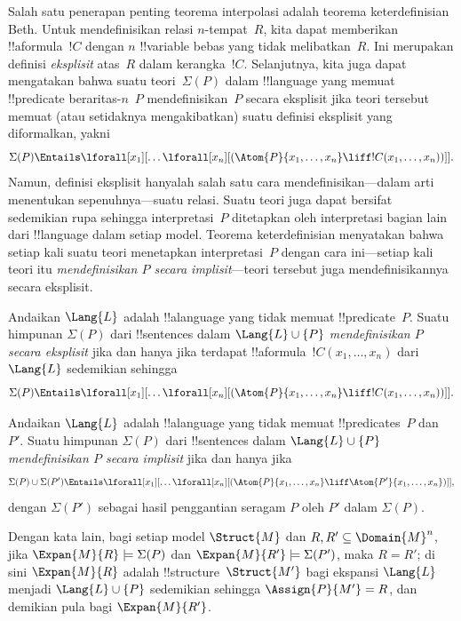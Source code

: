 \documentclass[../../../include/open-logic-section]{subfiles}
\begin{document}


Salah satu penerapan penting teorema interpolasi adalah teorema
keterdefinisian Beth. Untuk mendefinisikan relasi $n$-tempat~$R$, kita dapat
memberikan !!a{formula}~$!C$ dengan $n$ !!{variable} bebas yang tidak
melibatkan~$R$. Ini merupakan definisi \emph{eksplisit} atas~$R$ dalam
kerangka~$!C$. Selanjutnya, kita juga dapat mengatakan bahwa suatu
teori~$\Sigma(P)$ dalam !!{language} yang memuat !!{predicate}
beraritas-$n$~$P$ mendefinisikan~$P$ secara eksplisit jika teori tersebut
memuat (atau setidaknya mengakibatkan) suatu definisi eksplisit yang
diformalkan, yakni
\[
\Sigma(P) \Entails \lforall[x_1][\dots
  \lforall[x_n][(\Atom{P}{x_1,\dots, x_n} \liff !C(x_1, \dots,
    x_n))]].
\]
Namun, definisi eksplisit hanyalah salah satu cara mendefinisikan---dalam arti
menentukan sepenuhnya---suatu relasi. Suatu teori juga dapat bersifat
sedemikian rupa sehingga interpretasi~$P$ ditetapkan oleh interpretasi bagian
lain dari !!{language} dalam setiap model. Teorema keterdefinisian menyatakan
bahwa setiap kali suatu teori menetapkan interpretasi~$P$ dengan cara
ini---setiap kali teori itu \emph{mendefinisikan $P$ secara implisit}---teori
tersebut juga mendefinisikannya secara eksplisit.

\begin{defn}
Andaikan $\Lang{L}$ adalah !!a{language} yang tidak memuat
!!{predicate}~$P$. Suatu himpunan $\Sigma(P)$ dari !!{sentence}s dalam
$\Lang{L} \cup \{P\}$ \emph{mendefinisikan $P$ secara eksplisit} jika dan
hanya jika terdapat !!a{formula}~$!C(x_1, \dots, x_n)$ dari $\Lang{L}$
sedemikian sehingga
\[
\Sigma(P) \Entails \lforall[x_1][\dots
  \lforall[x_n][(\Atom{P}{x_1,\dots, x_n} \liff !C(x_1, \dots,
    x_n))]].
\]
\end{defn}

\begin{defn}
Andaikan $\Lang{L}$ adalah !!a{language} yang tidak memuat
!!{predicate}s~$P$ dan~$P'$. Suatu himpunan $\Sigma(P)$ dari !!{sentence}s
dalam $\Lang{L} \cup \{P\}$ \emph{mendefinisikan $P$ secara implisit}
jika dan hanya jika
\[
\Sigma(P) \cup \Sigma(P') \Entails \lforall[x_1][\dots
  \lforall[x_n][(\Atom{P}{x_1,\dots, x_n} \liff \Atom{P'}{x_1,\dots,
      x_n})]],
\]
dengan $\Sigma(P')$ sebagai hasil penggantian seragam $P$ oleh $P'$ dalam
$\Sigma(P)$.
\end{defn}

Dengan kata lain, bagi setiap model $\Struct{M}$ dan $R, R' \subseteq
\Domain{M}^n$, jika $\Expan{M}{R} \models \Sigma(P)$ dan
$\Expan{M}{R'} \models \Sigma(P')$, maka $R=R'$; di sini
$\Expan{M}{R}$ adalah !!{structure}~$\Struct{M'}$ bagi ekspansi
$\Lang{L}$ menjadi $\Lang{L} \cup \{P\}$ sedemikian sehingga
$\Assign{P}{M'} = R$, dan demikian pula bagi $\Expan{M}{R'}$.
\end{document}
